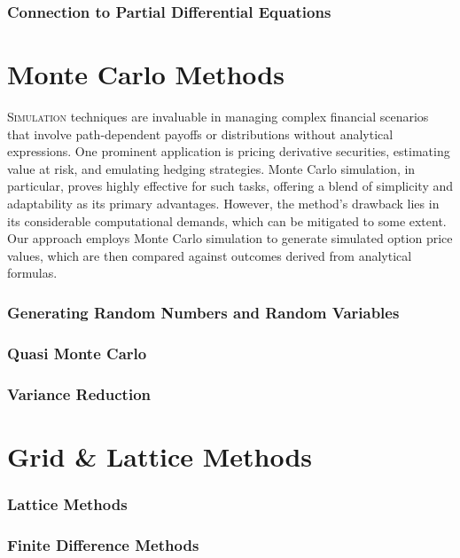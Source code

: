 \documentclass[12pt, a4paper]{article}
\begin{document}
\section{Connection to Partial Differential Equations}
%

\part{Monte Carlo Methods}
\lettrine[lines=2, lhang=0.1]{S}{imulation} techniques are invaluable in managing complex financial scenarios that involve path-dependent payoffs or distributions without analytical expressions. One prominent application is pricing derivative securities, estimating value at risk, and emulating hedging strategies. Monte Carlo simulation, in particular, proves highly effective for such tasks, offering a blend of simplicity and adaptability as its primary advantages. However, the method's drawback lies in its considerable computational demands, which can be mitigated to some extent. Our approach employs Monte Carlo simulation to generate simulated option price values, which are then compared against outcomes derived from analytical formulas.
\section{Generating Random Numbers and Random Variables}


\section{Quasi Monte Carlo}
%


\section{Variance Reduction}
%

\part{Grid \& Lattice Methods}

\section{Lattice Methods}
%

\section{Finite Difference Methods}
\end{document}
